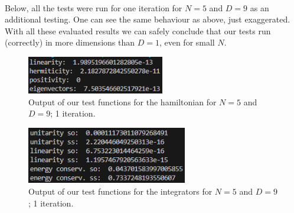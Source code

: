 \documentclass[11pt, letterpaper, onecolumn]{article}
\begin{document}
	\\
	Below, all the tests were run for one iteration for $N=5$ and $D=9$ as an additional testing. One can see the same behaviour as above, just exaggerated. \\
	With all these evaluated results we can safely conclude that our tests run (correctly) in more dimensions than $D=1$, even for small $N$.
	\begin{figure} [h] 
	\begin{center}
	\includegraphics[width=6cm]{"test_hamiltonian-9D2.png"}
	\caption{Output of our test functions for the hamiltonian for $N=5$ and $D=9$; 1 iteration.}
	\end{center}
	\end{figure}
	\begin{figure} [h] 
	\begin{center}
	\includegraphics[width=7cm]{"test_integrators-9D2.png"}
	\caption{Output of our test functions for the integrators for $N=5$ and $D=9$; 1 iteration.}
	\end{center}
	\end{figure}
	
	
	
	
	
	
	
\end{document}
